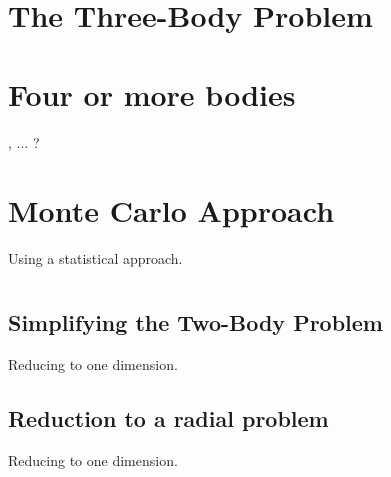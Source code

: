 \documentclass[12pt,a4paper]{report}
\begin{document}
\chapter{The Three-Body Problem}
\label{cha:the_three_body_problem}



\chapter{Four or more bodies}
\label{cha:four_or_more_bodies}

,  ... ?

\chapter{Monte Carlo Approach}
\label{cha:monte_carlo_approach}

Using a statistical approach.

\appendix

\chapter{}

\section{Simplifying the Two-Body Problem}
\label{sec:the_two_body_problem}

Reducing to one dimension.

\section{Reduction to a radial problem}
\label{sec:reduction_to_a_radial_problem}

Reducing to one dimension.
\end{document}

